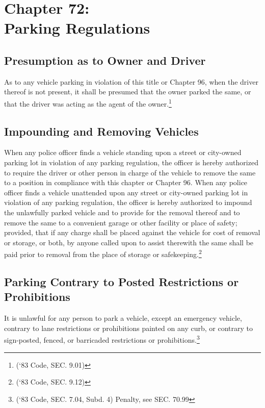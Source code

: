 \chapter*{Chapter 72: \\
	Parking Regulations}
    \minitoc
    \pagebreak



\section{Presumption as to Owner and Driver}
As to any vehicle parking in violation of this title or Chapter 96, when the driver thereof is not present, it shall be presumed that the owner parked the same, or that the driver was acting as the agent of the owner.\footnote{(‘83 Code, SEC. 9.01)}

\section{Impounding and Removing Vehicles}
When any police officer finds a vehicle standing upon a street or city-owned parking lot in violation of any parking regulation, the officer is hereby authorized to require the driver or other person in charge of the vehicle to remove the same to a position in compliance with this chapter or Chapter 96. When any police officer finds a vehicle unattended upon any street or city-owned parking lot in violation of any parking regulation, the officer is hereby authorized to impound the unlawfully parked vehicle and to provide for the removal thereof and to remove the same to a convenient garage or other facility or place of safety; provided, that if any charge shall be placed against the vehicle for cost of removal or storage, or both, by anyone called upon to assist therewith the same shall be paid prior to removal from the place of storage or safekeeping.\footnote{(‘83 Code, SEC. 9.12)}\\



\setcounter{section}{14}
\section{Parking Contrary to Posted Restrictions or Prohibitions}
It is unlawful for any person to park a vehicle, except an emergency vehicle, contrary to lane restrictions or prohibitions painted on any curb, or contrary to sign-posted, fenced, or barricaded restrictions or prohibitions.\footnote{(‘83 Code, SEC. 7.04, Subd. 4)  Penalty, see SEC. 70.99}

